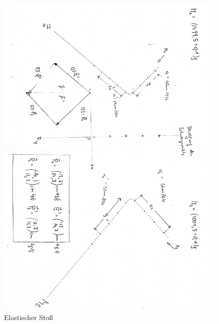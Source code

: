 \documentclass[12pt,a4paper]{article}
\begin{document}
\begin{figure}[H]
	\centering
	\includegraphics[scale=0.9]{./figure/elastischer_stoss.png}
	\caption{Elastischer Stoß}
	\label{fig:elastisch_stoss}
\end{figure}
\end{document}
